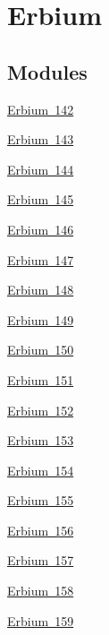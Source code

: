 \hypertarget{group___isotope_const-_erbium}{}\section{Erbium}
\label{group___isotope_const-_erbium}
\subsection*{Modules}
\begin{DoxyCompactItemize}
\item 
\mbox{\hyperlink{group___isotope_const-_erbium-_er142}{Erbium 142}}
\item 
\mbox{\hyperlink{group___isotope_const-_erbium-_er143}{Erbium 143}}
\item 
\mbox{\hyperlink{group___isotope_const-_erbium-_er144}{Erbium 144}}
\item 
\mbox{\hyperlink{group___isotope_const-_erbium-_er145}{Erbium 145}}
\item 
\mbox{\hyperlink{group___isotope_const-_erbium-_er146}{Erbium 146}}
\item 
\mbox{\hyperlink{group___isotope_const-_erbium-_er147}{Erbium 147}}
\item 
\mbox{\hyperlink{group___isotope_const-_erbium-_er148}{Erbium 148}}
\item 
\mbox{\hyperlink{group___isotope_const-_erbium-_er149}{Erbium 149}}
\item 
\mbox{\hyperlink{group___isotope_const-_erbium-_er150}{Erbium 150}}
\item 
\mbox{\hyperlink{group___isotope_const-_erbium-_er151}{Erbium 151}}
\item 
\mbox{\hyperlink{group___isotope_const-_erbium-_er152}{Erbium 152}}
\item 
\mbox{\hyperlink{group___isotope_const-_erbium-_er153}{Erbium 153}}
\item 
\mbox{\hyperlink{group___isotope_const-_erbium-_er154}{Erbium 154}}
\item 
\mbox{\hyperlink{group___isotope_const-_erbium-_er155}{Erbium 155}}
\item 
\mbox{\hyperlink{group___isotope_const-_erbium-_er156}{Erbium 156}}
\item 
\mbox{\hyperlink{group___isotope_const-_erbium-_er157}{Erbium 157}}
\item 
\mbox{\hyperlink{group___isotope_const-_erbium-_er158}{Erbium 158}}
\item 
\mbox{\hyperlink{group___isotope_const-_erbium-_er159}{Erbium 159}}

\end{DoxyCompactItemize}
